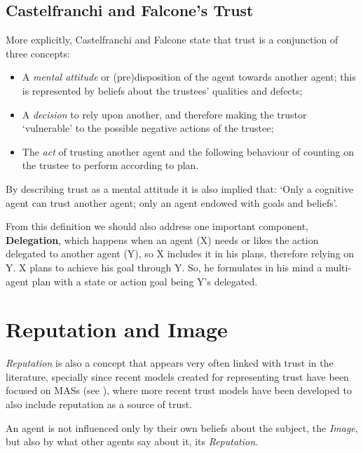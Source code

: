 \subsection{Castelfranchi and Falcone's Trust}
\label{subsec:CastelfranchiTrust}
More explicitly, Castelfranchi and Falcone\cite{Castelfranchi1998} state that trust is a conjunction of three concepts:
\begin{itemize}
    \item A \textit{mental attitude} or (pre)disposition of the agent towards another agent; this is represented by beliefs about the trustees' qualities and defects;
    \item A \textit{decision} to rely upon another, and therefore making the trustor `vulnerable' to the possible negative actions of the trustee;
    \item The \textit{act} of trusting another agent and the following behaviour of counting on the trustee to perform according to plan. 
\end{itemize}
By describing trust as a mental attitude it is also implied that: `Only a cognitive agent can trust another agent; only an agent endowed with goals and beliefs'\cite{Castelfranchi2010}.

From this definition we should also address one important component, \textbf{Delegation}, which happens when an agent (X) needs or likes the action delegated to another agent (Y), so X includes it in his plans, therefore relying on Y. X plans to achieve his goal through Y. So, he formulates in his mind a multi-agent plan with a state or action goal being Y’s delegated\cite{Castelfranchi1998}.



\section{Reputation and Image}
\label{sec:Reputation}
\textit{Reputation} is also a concept that appears very often linked with trust in the literature, specially since recent models created for representing trust have been focused on \acp{MAS} (see \cite{Abdul-rahman2000, Sabater2002, Sabater2006, Huynh2006, Pinyol2009}), where more recent trust models have been developed to also include reputation as a source of trust.

An agent is not influenced only by their own beliefs about the subject, the \textit{Image}, but also by what other agents say about it, its \textit{Reputation}.

